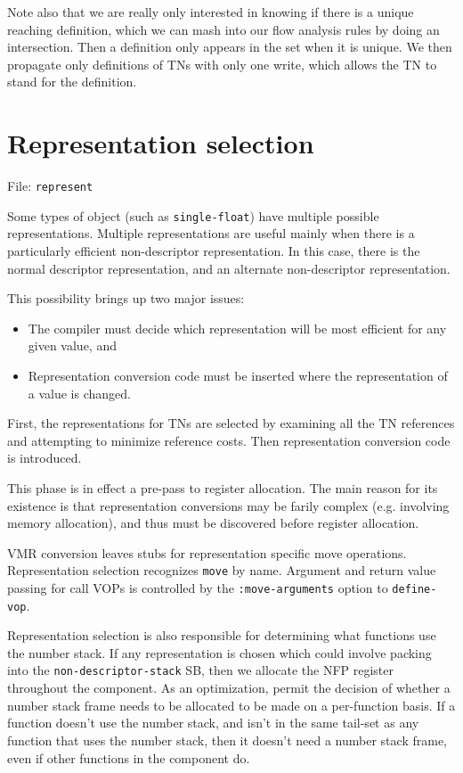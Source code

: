 Note also that we are really only interested in knowing if there is a
unique reaching definition, which we can mash into our flow analysis rules by
doing an intersection.  Then a definition only appears in the set when it is
unique.  We then propagate only definitions of TNs with only one write, which
allows the TN to stand for the definition.


\chapter{Representation selection}

File: {\tt represent}

Some types of object (such as {\tt single-float}) have multiple possible
representations.  Multiple representations are useful mainly when there is a
particularly efficient non-descriptor representation.  In this case, there is
the normal descriptor representation, and an alternate non-descriptor
representation.

This possibility brings up two major issues:
\begin{itemize}
\item The compiler must decide which representation will be most efficient for
any given value, and

\item Representation conversion code must be inserted where the representation
of a value is changed.
\end{itemize}
First, the representations for TNs are selected by examining all the TN
references and attempting to minimize reference costs.  Then representation
conversion code is introduced.

This phase is in effect a pre-pass to register allocation.  The main reason for
its existence is that representation conversions may be farily complex (e.g.
involving memory allocation), and thus must be discovered before register
allocation.


VMR conversion leaves stubs for representation specific move operations.
Representation selection recognizes {\tt move} by name.  Argument and return
value passing for call VOPs is controlled by the {\tt :move-arguments} option
to {\tt define-vop}.

Representation selection is also responsible for determining what functions use
the number stack.  If any representation is chosen which could involve packing
into the {\tt non-descriptor-stack} SB, then we allocate the NFP register
throughout the component.  As an optimization, permit the decision of whether a
number stack frame needs to be allocated to be made on a per-function basis.
If a function doesn't use the number stack, and isn't in the same tail-set as
any function that uses the number stack, then it doesn't need a number stack
frame, even if other functions in the component do.

